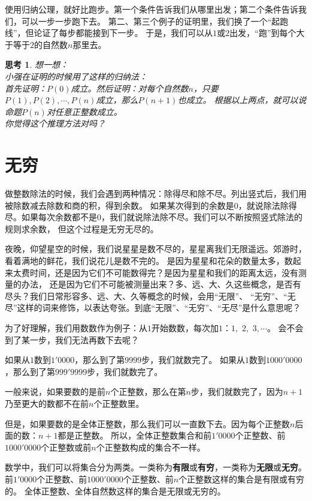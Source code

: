 \documentclass[12pt,UTF8]{ctexbook}
\newtheorem{sk}{思考}[section]
\begin{document}
使用归纳公理，就好比跑步。第一个条件告诉我们从哪里出发；第二个条件告诉我们，可以一步一步跑下去。
第二、第三个例子的证明里，我们换了一个“起跑线”，但论证了每步都能接到下一步。
于是，我们可以从$1$或$2$出发，“跑”到每个大于等于$2$的自然数$n$那里去。

\begin{sk}\label{sk:2-2-1}
    想一想：\\
    小强在证明的时候用了这样的归纳法：\\
    首先证明：$P(0)$成立。然后证明：对每个自然数$n$，只要$P(1), P(2), \cdots , P(n)$成立，那么$P(n+1)$也成立。
    根据以上两点，就可以说命题$P(n)$对任意正整数成立。\\
    你觉得这个推理方法对吗？
\end{sk}

\section{无穷}
做整数除法的时候，我们会遇到两种情况：除得尽和除不尽。列出竖式后，我们用被除数减去除数和商的积，得到余数。
如果某次得到的余数是$0$，就说除法除得尽。如果每次余数都不是$0$，我们就说除法除不尽。我们可以不断按照竖式除法的规则求余数，
但这个过程是无穷无尽的。

夜晚，仰望星空的时候，我们说星星是数不尽的，星星离我们无限遥远。郊游时，看着满地的鲜花，我们说花儿是数不完的。
是因为星星和花朵的数量太多，数起来太费时间，还是因为它们不可能数得完？是因为星星和我们的距离太远，没有测量的办法，
还是因为它们不可能被测量出来？多、远、大、久这些概念，是否有尽头？我们日常形容多、远、大、久等概念的时候，会用“无限”、
“无穷”、“无尽”这样的词来修饰，以表达夸张。到底“无限”、“无穷”、“无尽”是什么意思呢？

为了好理解，我们用数数作为例子：从$1$开始数数，每次加$1$：$1,\,\,2,\,\,3,\cdots$。
会不会到了某一步，我们无法再数下去呢？

如果从$1$数到$1'0000$，那么到了第$9999$步，我们就数完了。
如果从$1$数到$1000'0000$，那么到了第$999'9999$步，我们就数完了。

一般来说，如果要数的是前$n$个正整数，那么在第$n$步，我们就数完了，因为$n+1$乃至更大的数都不在前$n$个正整数里。

但是，如果要数的是全体正整数，那么我们可以一直数下去。因为每个正整数$n$后面的数：$n+1$都是正整数。
所以，全体正整数集合和前$1'0000$个正整数、前$1000'0000$个正整数或前$n$个正整数构成的集合不一样。

数学中，我们可以将集合分为两类。一类称为\textbf{有限}或\textbf{有穷}，一类称为\textbf{无限}或\textbf{无穷}。
前$1'0000$个正整数、前$1000'0000$个正整数、前$n$个正整数这样的集合是有限或有穷的。
全体正整数、全体自然数这样的集合是无限或无穷的。
\end{document}
